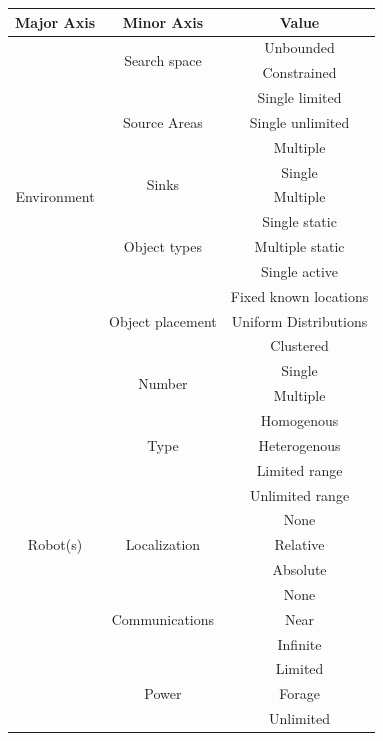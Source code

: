 \begin{table}
\begin{tabular}{ | c | c | c |}
	\hline
	Major Axis & Minor Axis & Value  \\ \hline
	\multirow{13}{*}{Environment}
		& \multirow{2}{*}{Search space} 
			& Unbounded \\  
		& 	& Constrained \\ \cline{2-3}
		& \multirow{3}{*}{Source Areas} 
			& Single limited \\ 
		&	& Single unlimited \\
		&	& Multiple \\ \cline{2-3}
		& \multirow{2}{*}{Sinks} 
			& Single \\
		&	& Multiple \\ \cline{2-3}
		& \multirow{3}{*}{Object types} 
			& Single static \\
		&	& Multiple static \\
		&	& Single active \\ \cline{2-3}
		& \multirow{3}{*}{Object placement} 
			& Fixed known locations \\
		&	& Uniform Distributions \\
		&	& Clustered \\\hline
	\multirow{16}{*}{Robot(s)}
		& \multirow{2}{*}{Number} 
			& Single \\  
		& 	& Multiple \\ \cline{2-3}
		& \multirow{3}{*}{Type} 
			& Homogenous \\ 
		&	& Heterogenous \\ \cline{2-3}
		& \multirow{2}{*}{Object Sensing} 
			& Limited range \\
		&	& Unlimited range\\ \cline{2-3}
		& \multirow{3}{*}{Localization} 
			& None \\
		&	& Relative \\
		&	& Absolute \\ \cline{2-3}
		& \multirow{3}{*}{Communications} 
			& None \\
		&	& Near \\
		&	& Infinite \\\cline{2-3}
		& \multirow{3}{*}{Power} 
			& Limited \\
		&	& Forage \\
		&	& Unlimited \\\hline
\end{tabular}
\end{table}

